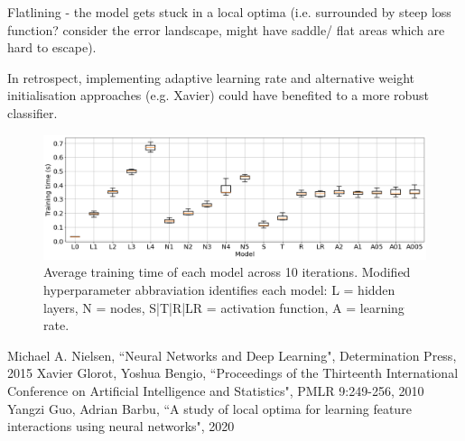 \documentclass{article}
\begin{document}
Flatlining - the model gets stuck in a local optima (i.e. surrounded by steep loss function? consider the error landscape, might have saddle/ flat areas which are hard to escape).

In retrospect, implementing adaptive learning rate and alternative weight initialisation approaches (e.g. Xavier) could have benefited to a more robust classifier.

\begin{figure}[H]
  \centering
  \includegraphics[width=\textwidth]{figs/times.png}
  \caption{
    Average training time of each model across 10 iterations.
    Modified hyperparameter abbraviation identifies each model:
    L = hidden layers, N = nodes, S|T|R|LR = activation function,
    A = learning rate.
  }
  \label{fig:times}
\end{figure}

\begin{thebibliography}{10}
 Michael A. Nielsen, ``Neural Networks and Deep Learning", Determination Press, 2015
Xavier Glorot, Yoshua Bengio, ``Proceedings of the Thirteenth International Conference on Artificial Intelligence and Statistics", PMLR 9:249-256, 2010
  Yangzi Guo, Adrian Barbu, ``A study of local optima for learning feature interactions using neural networks", 2020

\end{thebibliography}
\end{document}
